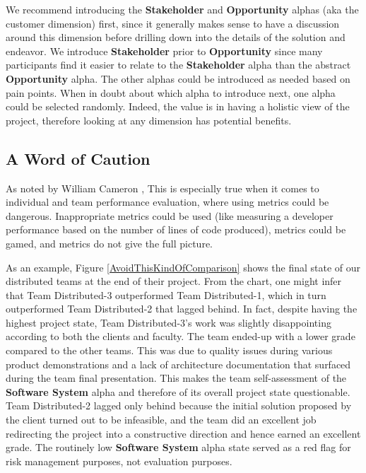 We recommend introducing the \textbf{Stakeholder} and \textbf{Opportunity} alphas (aka the customer dimension) first, since it generally makes sense to have a discussion around this dimension before drilling down into the details of the solution and endeavor. We introduce \textbf{Stakeholder} prior to \textbf{Opportunity} since many participants find it easier to relate to the \textbf{Stakeholder} alpha than the abstract \textbf{Opportunity} alpha. The other alphas could be introduced as needed based on pain points. When in doubt about which alpha to introduce next, one alpha could be selected randomly. Indeed, the value is in having a holistic view of the project, therefore looking at any dimension has potential benefits.

\subsection{A Word of Caution}
As noted by William Cameron \cite{CameronSociologicalThinking},  This is especially true when it comes to individual and team performance evaluation, where using metrics could be dangerous. Inappropriate metrics could be used (like measuring a developer performance based on the number of lines of code produced), metrics could be gamed, and metrics do not give the full picture.

As an example, Figure \ref{AvoidThisKindOfComparison} shows the final state of our distributed teams at the end of their project. From the chart, one might infer that Team Distributed-3 outperformed Team Distributed-1, which in turn outperformed Team Distributed-2 that lagged behind. In fact, despite having the highest project state, Team Distributed-3's work was slightly disappointing according to both the clients and faculty. The team ended-up with a lower grade compared to the other teams. This was due to quality issues during various product demonstrations and a lack of architecture documentation that surfaced during the team final presentation. This makes the team self-assessment of the \textbf{Software System} alpha and therefore of its overall project state questionable. Team Distributed-2 lagged only behind because the initial solution proposed by the client turned out to be infeasible, and the team did an excellent job redirecting the project into a constructive direction and hence earned an excellent grade. The routinely low \textbf{Software System} alpha state served as a red flag for risk management purposes, not evaluation purposes.

